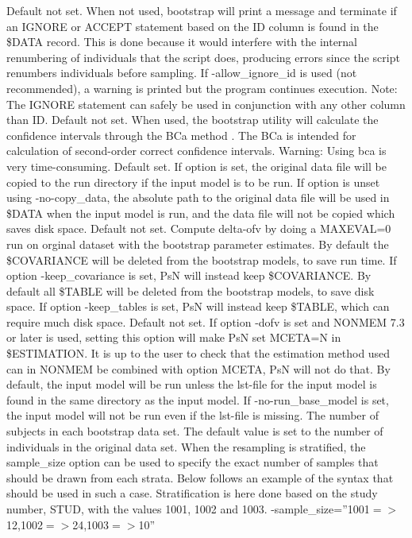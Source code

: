 \begin{optionlist}
Default not set. When not used, bootstrap will print a message and terminate if an IGNORE or ACCEPT statement based on the ID column is found in the \$DATA record. This is done because it would interfere with the internal renumbering of individuals that the script does, producing errors since the script renumbers individuals before sampling. If -allow\_ignore_id is used (not recommended), a warning is printed but the program continues execution. 
Note: The IGNORE statement can safely be used in conjunction with any other column than ID.
\nextopt
{}
Default not set. When used, the bootstrap utility will calculate the confidence intervals through the BCa method \cite{Efron}. The BCa is intended for calculation of second-order correct confidence intervals. Warning: Using bca is very time-consuming. 
\nextopt
{}
Default set. If option is set, the original data file will be copied to the run directory if the input model is to be run. If option is unset using -no-copy\_data, the absolute path to the original data file will be used in \$DATA when the input model is run, and the data file will not be copied which saves disk space.
\nextopt
{}
Default not set. Compute delta-ofv by doing a MAXEVAL=0 run on orginal dataset with the bootstrap parameter estimates.
\nextopt
{}
By default the \$COVARIANCE will be deleted from the bootstrap models, to save run time. If option -keep\_covariance is set, PsN will instead keep \$COVARIANCE.
\nextopt
{}
By default all \$TABLE will be deleted from the bootstrap models, to save disk space. If option -keep\_tables is set, PsN will instead keep \$TABLE, which can require much disk space.
\nextopt
{}
Default not set. If option -dofv is set and NONMEM 7.3 or later is used, setting this option will make PsN set MCETA=N in \$ESTIMATION. It is up to the user to check that the estimation method used can in NONMEM be combined with option MCETA, PsN will not do that.
\nextopt
{}
By default, the input model will be run unless the lst-file for the input model is found in the same directory as the input model. If -no-run\_base\_model  is set, the input model will not be run even if the lst-file is missing.
\nextopt
{}
The number of subjects in each bootstrap data set. The default value is set to the number of individuals in the original data set. When the resampling is stratified, the sample\_size option can be used to specify the exact number of samples that should be drawn from each strata. Below follows an example of the syntax that should be used in such a case. Stratification is here done based on the study number, STUD, with the values 1001, 1002 and 1003. -sample\_size=''1001$=>$12,1002$=>$24,1003$=>$10''                          

\end{optionlist}
